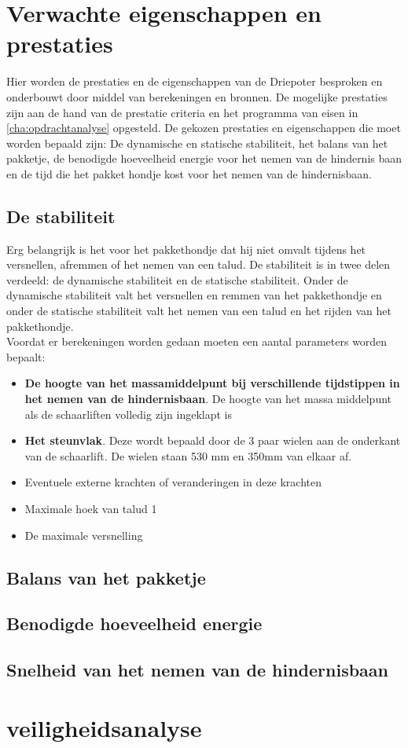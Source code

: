 \section{Verwachte eigenschappen en prestaties}
\label{se:prestatie_en_eigenschappen}
Hier worden de prestaties en de eigenschappen van de Driepoter besproken en onderbouwt door middel van berekeningen en bronnen. De mogelijke prestaties zijn aan de hand van de prestatie criteria en het programma van eisen in \cref{cha:opdrachtanalyse} opgesteld. De gekozen prestaties en eigenschappen die moet worden bepaald zijn: De dynamische en statische stabiliteit, het balans van het pakketje, de benodigde hoeveelheid energie voor het nemen van de hindernis baan en de tijd die het pakket hondje kost voor het nemen van de hindernisbaan. 

\subsection{De stabiliteit}
Erg belangrijk is het voor het pakkethondje dat hij niet omvalt tijdens het versnellen, afremmen of het nemen van een talud. De stabiliteit is in twee delen verdeeld: de dynamische stabiliteit en de statische stabiliteit. Onder de dynamische stabiliteit valt het versnellen en remmen van het pakkethondje en onder de statische stabiliteit valt het nemen van een talud en het rijden van het pakkethondje.\\
Voordat er berekeningen worden gedaan moeten een aantal parameters worden bepaalt:

\begin{itemize}
    \item \textbf{De hoogte van het massamiddelpunt bij verschillende tijdstippen in het nemen van de hindernisbaan}. De hoogte van het massa middelpunt als de schaarliften volledig zijn ingeklapt is 
    \item \textbf{Het steunvlak}. Deze wordt bepaald door de 3 paar wielen aan de onderkant van de schaarlift. De wielen staan 530 mm en 350mm van elkaar af. 
    \item Eventuele externe krachten of veranderingen in deze krachten
    \item Maximale hoek van talud 1
    \item De maximale versnelling
\end{itemize}
\vspace{\baselineskip}

\subsection{Balans van het pakketje}

\subsection{Benodigde hoeveelheid energie}

\subsection{Snelheid van het nemen van de hindernisbaan}


\section{veiligheidsanalyse}
\label{se:veiligheidsanalyse_prestatieverwachting}

